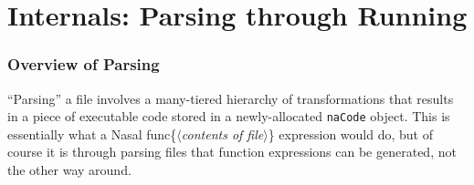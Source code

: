 \documentclass{article}
\newcommand{\todo}[1]{}
\newcommand{\comment}[1]{}%
\newcommand{\type}[1]{\textcolor{type}{\tt #1}}
\newcommand{\nasalkeyword}[1]{\textcolor{keyword}{#1}}
\begin{document}
\part{Internals: Parsing through Running}
\comment{
\section{Code Generation Steps}

\todo{use different block styles for FILE/PROGRAM input, parser, codegen, VM ?}
\tikzstyle{block} = [rectangle, draw, fill=blue!20, text width=5em, text centered, rounded corners, minimum height=4em]
\tikzstyle{line} = [draw, -latex']
    

\begin{tikzpicture}[node distance = 2cm, auto]
	
    \node [block] (source) {Source Code};
    \node [block, below of=source] (tokenizer) {Tokenize};
    \node [block, below of=tokenizer] (parser) {Parse};
    \node [block, below of=parser] (codegen) {Generate Code};
    \node [block, below of=codegen] (vm) {Run Code (VM)};
    \node [block, right of=vm] (GC) {Garbage Collector (GC)};
    
    \path [line] (source) -- (tokenizer);
    \path [line] (tokenizer) -- (parser);
    \path [line] (parser) -- (codegen);
    \path [line] (codegen) -- (vm);
    \path [line] (vm) -- (GC);
    
\end{tikzpicture}
}

\section{Overview of Parsing}
``Parsing'' a file involves a many-tiered hierarchy of transformations that results in a piece of executable code stored in a newly-allocated \type{naCode} object.  This is essentially what a Nasal \nasalkeyword{func}\{$\langle$\textit{contents of file}$\rangle$\} expression would do, but of course it is through parsing files that function expressions can be generated, not the other way around.
\end{document}
